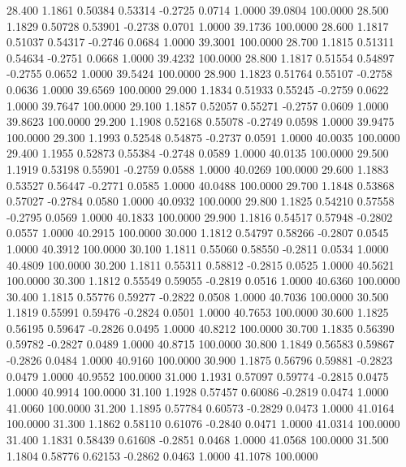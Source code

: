  28.400   1.1861   0.50384   0.53314  -0.2725   0.0714   1.0000  39.0804 100.0000
  28.500   1.1829   0.50728   0.53901  -0.2738   0.0701   1.0000  39.1736 100.0000
  28.600   1.1817   0.51037   0.54317  -0.2746   0.0684   1.0000  39.3001 100.0000
  28.700   1.1815   0.51311   0.54634  -0.2751   0.0668   1.0000  39.4232 100.0000
  28.800   1.1817   0.51554   0.54897  -0.2755   0.0652   1.0000  39.5424 100.0000
  28.900   1.1823   0.51764   0.55107  -0.2758   0.0636   1.0000  39.6569 100.0000
  29.000   1.1834   0.51933   0.55245  -0.2759   0.0622   1.0000  39.7647 100.0000
  29.100   1.1857   0.52057   0.55271  -0.2757   0.0609   1.0000  39.8623 100.0000
  29.200   1.1908   0.52168   0.55078  -0.2749   0.0598   1.0000  39.9475 100.0000
  29.300   1.1993   0.52548   0.54875  -0.2737   0.0591   1.0000  40.0035 100.0000
  29.400   1.1955   0.52873   0.55384  -0.2748   0.0589   1.0000  40.0135 100.0000
  29.500   1.1919   0.53198   0.55901  -0.2759   0.0588   1.0000  40.0269 100.0000
  29.600   1.1883   0.53527   0.56447  -0.2771   0.0585   1.0000  40.0488 100.0000
  29.700   1.1848   0.53868   0.57027  -0.2784   0.0580   1.0000  40.0932 100.0000
  29.800   1.1825   0.54210   0.57558  -0.2795   0.0569   1.0000  40.1833 100.0000
  29.900   1.1816   0.54517   0.57948  -0.2802   0.0557   1.0000  40.2915 100.0000
  30.000   1.1812   0.54797   0.58266  -0.2807   0.0545   1.0000  40.3912 100.0000
  30.100   1.1811   0.55060   0.58550  -0.2811   0.0534   1.0000  40.4809 100.0000
  30.200   1.1811   0.55311   0.58812  -0.2815   0.0525   1.0000  40.5621 100.0000
  30.300   1.1812   0.55549   0.59055  -0.2819   0.0516   1.0000  40.6360 100.0000
  30.400   1.1815   0.55776   0.59277  -0.2822   0.0508   1.0000  40.7036 100.0000
  30.500   1.1819   0.55991   0.59476  -0.2824   0.0501   1.0000  40.7653 100.0000
  30.600   1.1825   0.56195   0.59647  -0.2826   0.0495   1.0000  40.8212 100.0000
  30.700   1.1835   0.56390   0.59782  -0.2827   0.0489   1.0000  40.8715 100.0000
  30.800   1.1849   0.56583   0.59867  -0.2826   0.0484   1.0000  40.9160 100.0000
  30.900   1.1875   0.56796   0.59881  -0.2823   0.0479   1.0000  40.9552 100.0000
  31.000   1.1931   0.57097   0.59774  -0.2815   0.0475   1.0000  40.9914 100.0000
  31.100   1.1928   0.57457   0.60086  -0.2819   0.0474   1.0000  41.0060 100.0000
  31.200   1.1895   0.57784   0.60573  -0.2829   0.0473   1.0000  41.0164 100.0000
  31.300   1.1862   0.58110   0.61076  -0.2840   0.0471   1.0000  41.0314 100.0000
  31.400   1.1831   0.58439   0.61608  -0.2851   0.0468   1.0000  41.0568 100.0000
  31.500   1.1804   0.58776   0.62153  -0.2862   0.0463   1.0000  41.1078 100.0000
